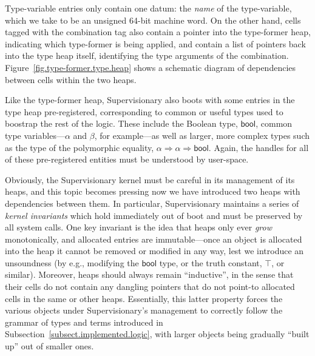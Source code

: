 \documentclass[a4paper, UKenglish, cleveref, autoref, thm-restate]{lipics-v2021}
\begin{document}
Type-variable entries only contain one datum: the \emph{name} of the type-variable, which we take to be an unsigned 64-bit machine word.
On the other hand, cells tagged with the combination tag also contain a pointer into the type-former heap, indicating which type-former is being applied, and contain a list of pointers back into the type heap itself, identifying the type arguments of the combination.
Figure~\ref{fig.type-former.type.heap} shows a schematic diagram of dependencies between cells within the two heaps.

Like the type-former heap, Supervisionary also boots with some entries in the type heap pre-registered, corresponding to common or useful types used to boostrap the rest of the logic.
These include the Boolean type, $\mathsf{bool}$, common type variables---$\alpha$ and $\beta$, for example---as well as larger, more complex types such as the type of the polymorphic equality, $\alpha \Rightarrow \alpha \Rightarrow \mathsf{bool}$.
Again, the handles for all of these pre-registered entities must be understood by user-space.

Obviously, the Supervisionary kernel must be careful in its management of its heaps, and this topic becomes pressing now we have introduced two heaps with dependencies between them.
In particular, Supervisionary maintains a series of \emph{kernel invariants} which hold immediately out of boot and must be preserved by all system calls.
One key invariant is the idea that heaps only ever \emph{grow} monotonically, and allocated entries are immutable---once an object is allocated into the heap it cannot be removed or modified in any way, lest we introduce an unsoundness (by e.g., modifying the $\mathsf{bool}$ type, or the truth constant, $\top$, or similar).
Moreover, heaps should always remain ``inductive'', in the sense that their cells do not contain any dangling pointers that do not point-to allocated cells in the same or other heaps.
Essentially, this latter property forces the various objects under Supervisionary's management to correctly follow the grammar of types and terms introduced in Subsection~\ref{subsect.implemented.logic}, with larger objects being gradually ``built up'' out of smaller ones.
\end{document}
